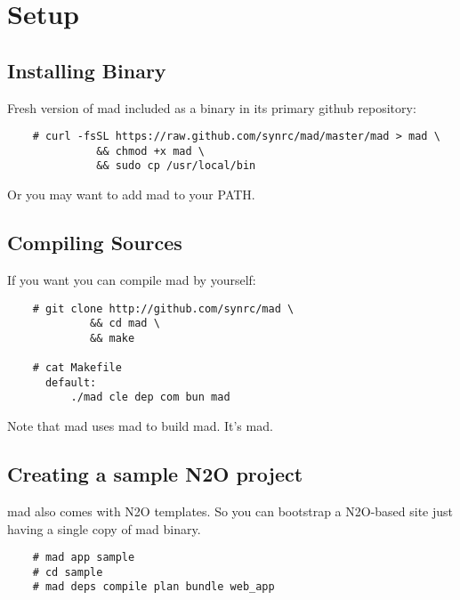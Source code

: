 \section{Setup}

\subsection{Installing Binary}

Fresh version of mad included as a binary in its primary github repository:

\vspace{1\baselineskip}
\begin{lstlisting}
    # curl -fsSL https://raw.github.com/synrc/mad/master/mad > mad \
              && chmod +x mad \
              && sudo cp /usr/local/bin
\end{lstlisting}
\vspace{1\baselineskip}

Or you may want to add mad to your PATH.

\subsection{Compiling Sources}

If you want you can compile mad by yourself:

\vspace{1\baselineskip}
\begin{lstlisting}
    # git clone http://github.com/synrc/mad \
             && cd mad \
             && make

    # cat Makefile
      default:
          ./mad cle dep com bun mad
\end{lstlisting}
\vspace{1\baselineskip}

Note that mad uses mad to build mad. It's mad.

\subsection{Creating a sample N2O project}

mad also comes with N2O templates. So you can bootstrap a N2O-based site
just having a single copy of mad binary.

\vspace{1\baselineskip}
\begin{lstlisting}
    # mad app sample
    # cd sample
    # mad deps compile plan bundle web_app
\end{lstlisting}
\vspace{1\baselineskip}

